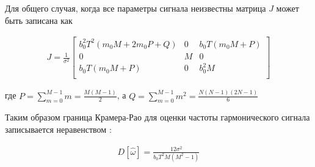 Для общего случая, когда все параметры сигнала неизвестны матрица ${J}$ может быть записана как
\begin{center}
\begin{eqnarray}
	\label{eq:crlb3_fisher}
	J = \frac{1}{\sigma^2}
		\left[ \begin{array}{ccc}
		b_0^2 T^2 (m_0 M +2 m_0 P + Q) & 0 & b_0 T (m_0 M+P) \\
		0 & M & 0  \\
		b_0 T (m_0 M+P) & 0 & b_0^2 M  \\
		\end{array} \right]
\end{eqnarray}
\end{center}
где ${P=\sum \limits_{m=0}^{M-1}m = \frac{M(M-1)}{2}}$, а ${Q = \sum \limits_{m=0}^{M-1}m^2 = \frac{N(N-1)(2N-1)}{6}}$

Таким образом граница Крамера-Рао для оценки частоты гармонического сигнала записывается неравенством \cite{skon-clrb-report, rife-crlb-article}:
\begin{center}
\begin{eqnarray}
	\label{eq:crlb3_omega}
	D[\hat \omega] = \frac{12 \sigma^2}{b_0 T^2 M (M^2 - 1)}
\end{eqnarray}
\end{center}

